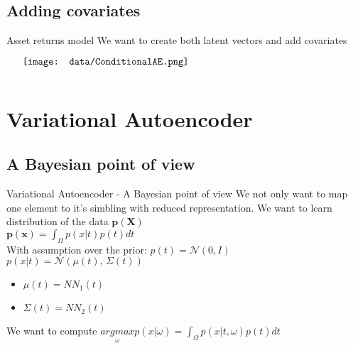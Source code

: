 \documentclass{beamer}
\begin{document}
\subsection{Adding covariates}
\begin{frame}{Asset returns model}
    We want to create both latent vectors and add covariates
    \begin{minipage}{5in}
    \centering
    $\vcenter{
    \texttt{[image: data/ConditionalAE.png]} \\
    }$
    \end{minipage}
\end{frame}

\section{Variational Autoencoder}
\subsection{A Bayesian point of view}
\begin{frame}{Variational Autoencoder - A Bayesian point of view}
    We not only want to map one element to it's simbling with reduced representation.
    We want to learn distribution of the data $\mathbf{p(X)}$ \\
    $ \mathbf{p(x)} = \int_\Omega p(x|t)p(t) dt$  \\
	With assumption over the prior: $p(t) = \mathcal{N}(0, I)$ \\
	$ p(x| t) = \mathcal{N}(\mu(t),\,\Sigma(t))$ \\
	\begin{itemize}
		\item $ \mu(t) = NN_1(t)$
		\item $ \Sigma(t) = NN_2(t)$
	\end{itemize}
	We want to compute $\underset{\omega}{argmax} p(x| \omega) = \int_\Omega p(x|t, \omega)p(t) dt$  \\
\end{frame}
\end{document}
